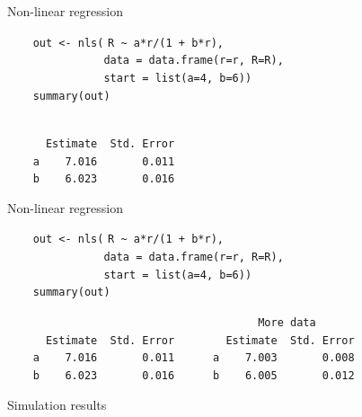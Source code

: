 \documentclass[aspectratio=169,12pt,t]{beamer}
\begin{document}
\begin{frame}[fragile]{Non-linear regression}
\addtocounter{framenumber}{-1}

\vspace{5mm}

\verb|    out <- nls(| {\tt \vhilit R \verb|~| a*r/(1 + b*r)}\verb|,| \\
\verb|               data = data.frame(r=r, R=R),| \\
\verb|               start = list(a=4, b=6))| \\
\verb|    summary(out)|

\vspace{8mm}

{\hilit
\verb|                          | \\
\verb|      Estimate  Std. Error| \\
\verb|    a    7.016       0.011| \\
\verb|    b    6.023       0.016|
}

\end{frame}


\begin{frame}[fragile]{Non-linear regression}
\addtocounter{framenumber}{-1}

\vspace{5mm}

\verb|    out <- nls(| {\tt \vhilit R \verb|~| a*r/(1 + b*r)}\verb|,| \\
\verb|               data = data.frame(r=r, R=R),| \\
\verb|               start = list(a=4, b=6))| \\
\verb|    summary(out)|

\vspace{8mm}

{\hilit
\verb|                                       More data      | \\
\verb|      Estimate  Std. Error        Estimate  Std. Error| \\
\verb|    a    7.016       0.011      a    7.003       0.008| \\
\verb|    b    6.023       0.016      b    6.005       0.012|
}

\end{frame}


\begin{frame}[c]{Simulation results}
\end{frame}
\end{document}
